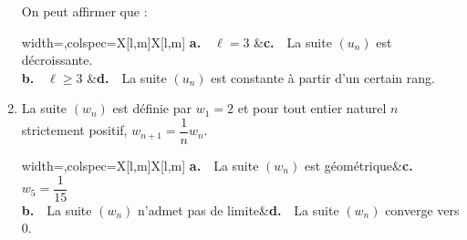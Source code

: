 \begin{enumerate}
	On peut affirmer que :
	
	\smallskip
	
	\begin{tblr}{width=\linewidth,colspec={X[l,m]X[l,m]}}
		\textbf{a.}~~$\ell = 3$ 		&\textbf{c.}~~La suite $\left(u_n\right)$ est décroissante.\\
		\textbf{b.}~~$\ell \geqslant 3$ &\textbf{d.}~~La suite $\left(u_n\right)$ est constante à partir d'un certain rang.
	\end{tblr}
	\item La suite $\left(w_n\right)$ est définie par $w_1 = 2$ et pour tout entier naturel $n$ strictement positif, $w_{n+1} = \dfrac1n w_n$.
	
	\smallskip
	
	\begin{tblr}{width=\linewidth,colspec={X[l,m]X[l,m]}}
		\textbf{a.}~~La suite $\left(w_n\right)$ est géométrique&\textbf{c.}~~$w_5 = \dfrac{1}{15}$\\
		\textbf{b.}~~La suite $\left(w_n\right)$ n'admet pas de limite&\textbf{d.}~~La suite $\left(w_n\right)$ converge vers 0.
	\end{tblr}
\end{enumerate}
